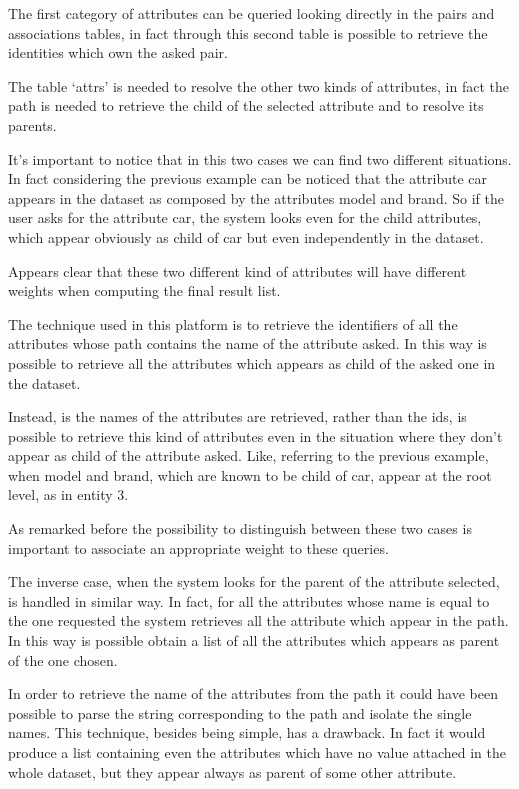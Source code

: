 \documentclass{acm_proc_article-sp-sigmod07}
\begin{document}
The first category of attributes can be queried looking directly in the
pairs and associations tables, in fact through this second table is
possible to retrieve the identities which own the asked pair.

The table `attrs' is needed to resolve the other two kinds of attributes,
in fact the path is needed to retrieve the child of the selected attribute
and to resolve its parents.

It's important to notice that in this two cases we can find two different
situations.
In fact considering the previous example can be noticed that the attribute
car appears in the dataset as composed by the attributes model and brand. 
So if the user asks for the attribute car, the system looks even for the
child attributes, which appear obviously as child of car but
even independently in the dataset.

Appears clear that these two different kind of attributes will have
different weights when computing the final result list.

The technique used in this platform is to retrieve the identifiers of all
the attributes whose path contains the name of the attribute asked.
In this way is possible to retrieve all the attributes which appears as
child of the asked one in the dataset.

Instead, is the names of the attributes are retrieved, rather than the
ids, is possible to retrieve this kind of attributes even in the situation
where they don't appear as child of the attribute asked. Like, referring
to the previous example, when model and brand, which are known to be child
of car, appear at the root level, as in entity 3.

As remarked before the possibility to distinguish between these two cases
is important to associate an appropriate weight to these queries.

The inverse case, when the system looks for the parent of the attribute
selected, is handled in similar way.
In fact, for all the attributes whose name is equal to the one requested
the system retrieves all the attribute which appear in the path.
In this way is possible obtain a list of all the attributes which appears
as parent of the one chosen.

In order to retrieve the name of the attributes from the path it could
have been possible to parse the string corresponding to the path and
isolate the single names.
This technique, besides being simple, has a drawback. In fact it would
produce a list containing even the attributes which have no value attached
in the whole dataset, but they appear always as parent of some other
attribute.
\end{document}
